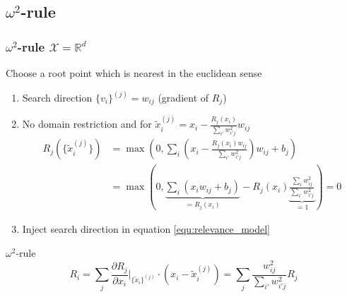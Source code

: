 \documentclass{beamer}
\begin{document}
\subsection[$\omega^2$-rule]{$\omega^2$-rule}


\begin{frame}
\frametitle{$\omega^2$-rule $\mathcal{X}=\mathbb{R}^d$}
\vspace{0.35cm}
Choose a root point which is nearest in the euclidean sense\\

\begin{enumerate}
	\item Search direction $\{v_i\}^{(j)} = w_{ij}$ (gradient of $R_j$)
	\item No domain restriction and for $\tilde{x}_i^{(j)} = x_i - \frac{R_j(x_i)}{\sum_{i'}w_{i'j}^2} w_{ij}$
	\begin{align*}
		R_j(\{\tilde{x}_i^{(j)}\}) &= \max(0, \sum_i (x_i -\frac{R_j(x_i) w_{ij}}{\sum_{i'}w_{i'j}^2}) w_{ij}  + b_j) \\
		&= \max(0, \underbrace{\sum_i (x_i w_{ij} + b_j)}_{=R_j(x_i)} - R_j (x_i) \underbrace{\frac{\sum_{i}w_{ij}^2}{\sum_{i'}w_{i'j}^2}}_{=1} )= 0 
	\end{align*}
	\vspace{-0.1cm}
	\item Inject search direction in equation \eqref{equ:relevance_model}
\end{enumerate}

\pause
\vspace{-0.15cm}
\begin{block}{$\omega^2$-rule}
\begin{equation*}
R_i =\sum_j\frac{\partial R_j}{\partial x_i}\Big|_{\{\tilde{x}_i\}^{(j)}} \cdot (x_i - \tilde{x}_i^{(j)}) =  \sum_j\frac{w_{ij}^2}{\sum_{i'} w_{i'j}^2} R_j
\end{equation*}
\end{block}



\end{frame}
\end{document}
